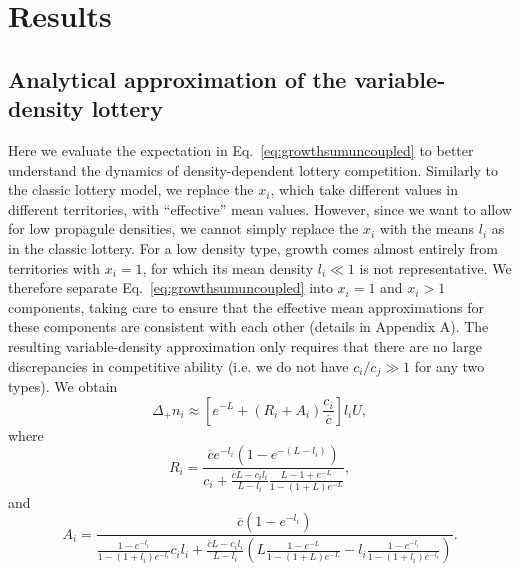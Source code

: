 \documentclass[12pt]{article}
\begin{document}
\section*{Results}

\subsection*{Analytical approximation of the variable-density lottery}

Here we evaluate the expectation in Eq.~\eqref{eq:growthsumuncoupled} to better understand the dynamics of density-dependent lottery competition. Similarly to the classic lottery model, we replace the $x_i$, which take different values in different territories, with ``effective'' mean values. However, since we want to allow for low propagule densities, we cannot simply replace the $x_i$ with the means $l_i$ as in the classic lottery. For a low density type, growth comes almost entirely from territories with $x_i=1$, for which its mean density $l_i\ll 1$ is not representative. We therefore separate Eq.~\eqref{eq:growthsumuncoupled} into $x_i=1$ and $x_i>1$ components, taking care to ensure that the effective mean approximations for these components are consistent with each other (details in Appendix A). The resulting variable-density approximation only requires that there are no large discrepancies in competitive ability (i.e. we do not have $c_i/c_j\gg 1$ for any two types). We obtain
\begin{equation}
\Delta_+ n_i\approx \left[e^{-L}+(R_i+A_i)\frac{c_i}{\overline{c}}\right]l_i U, \label{eq:master}
\end{equation}
where
\begin{equation}
R_i=\frac{\overline{c}e^{-l_i}(1-e^{-(L-l_i)})}{c_i +\frac{\overline{c}L- c_il_i}{L-l_i}\frac{L-1+e^{-L}}{1-(1+L)e^{-L}}},\nonumber \label{eq:Dr}
\end{equation}
and
\begin{equation}
A_i=\frac{\overline{c}(1-e^{-l_i})}{\frac{1-e^{-l_i}}{1-(1+l_i)e^{-l_i}}c_il_i+\frac{\overline{c}L- c_il_i}{L-l_i}\left(L\frac{1-e^{-L}}{1-(1+L)e^{-L}}-l_i\frac{1-e^{-l_i}}{1-(1+l_i)e^{-l_i}}\right)}. \nonumber \label{eq:Da}
\end{equation}
\end{document}
